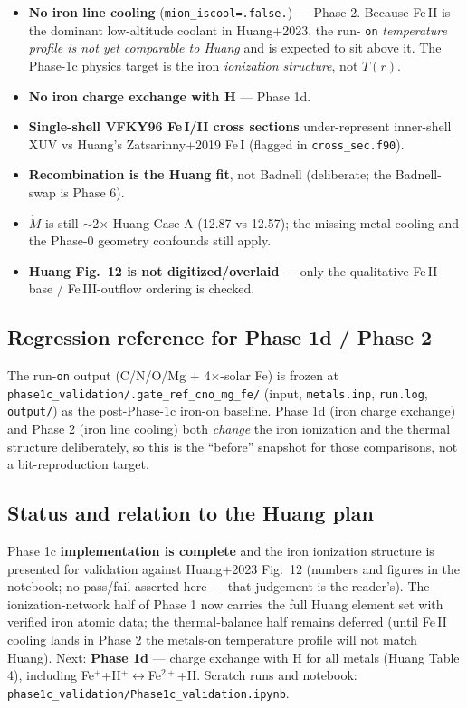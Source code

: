 \documentclass[english,a4paper]{kiseon_memo}
\begin{document}
\begin{itemize}
\item \textbf{No iron line cooling} (\verb|mion_iscool=.false.|) --- Phase 2.
  Because Fe\,II is the dominant low-altitude coolant in Huang+2023, the run-%
  \texttt{on} \emph{temperature profile is not yet comparable to Huang} and is
  expected to sit above it. The Phase-1c physics target is the iron \emph{ionization
  structure}, not $T(r)$.
\item \textbf{No iron charge exchange with H} --- Phase 1d.
\item \textbf{Single-shell VFKY96 Fe\,I/II cross sections} under-represent
  inner-shell XUV vs Huang's Zatsarinny+2019 Fe\,I (flagged in
  \texttt{cross\_sec.f90}).
\item \textbf{Recombination is the Huang fit}, not Badnell (deliberate; the
  Badnell-swap is Phase 6).
\item $\dot M$ is still $\sim$2$\times$ Huang Case A (12.87 vs 12.57); the missing
  metal cooling and the Phase-0 geometry confounds still apply.
\item \textbf{Huang Fig.~12 is not digitized/overlaid} --- only the qualitative
  Fe\,II-base / Fe\,III-outflow ordering is checked.
\end{itemize}

\subsection{Regression reference for Phase 1d / Phase 2}

The run-\texttt{on} output (C/N/O/Mg $+$ 4$\times$-solar Fe) is frozen at
\texttt{phase1c\_validation/.gate\_ref\_cno\_mg\_fe/} (input, \texttt{metals.inp},
\texttt{run.log}, \texttt{output/}) as the post-Phase-1c iron-on baseline.
Phase 1d (iron charge exchange) and Phase 2 (iron line cooling) both \emph{change}
the iron ionization and the thermal structure deliberately, so this is the
``before'' snapshot for those comparisons, not a bit-reproduction target.

\subsection{Status and relation to the Huang plan}

Phase 1c \textbf{implementation is complete} and the iron ionization structure is
presented for validation against Huang+2023 Fig.~12 (numbers and figures in the
notebook; no pass/fail asserted here --- that judgement is the reader's). The
ionization-network half of Phase 1 now carries the full Huang element set with
verified iron atomic data; the thermal-balance half remains deferred (until Fe\,II
cooling lands in Phase 2 the metals-on temperature profile will not match Huang).
Next: \textbf{Phase 1d} --- charge exchange with H for all metals (Huang Table 4),
including Fe$^+$+H$^+\!\leftrightarrow$Fe$^{2+}$+H. Scratch runs and notebook:
\texttt{phase1c\_validation/Phase1c\_validation.ipynb}.
\end{document}
